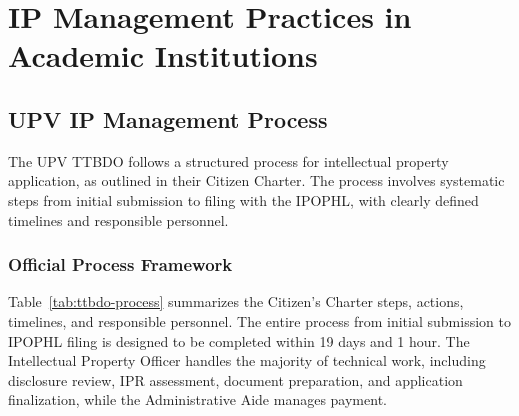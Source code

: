 \section{IP Management Practices in Academic Institutions}

\subsection{UPV IP Management Process}
The UPV TTBDO follows a structured process for intellectual property application, as outlined in their Citizen Charter. The process involves systematic steps from initial submission to filing with the IPOPHL, with clearly defined timelines and responsible personnel.

\subsubsection{Official Process Framework}

Table~\ref{tab:ttbdo-process} summarizes the Citizen's Charter steps, actions, timelines, and responsible personnel. The entire process from initial submission to IPOPHL filing is designed to be completed within 19 days and 1 hour. The Intellectual Property Officer handles the majority of technical work, including disclosure review, IPR assessment, document preparation, and application finalization, while the Administrative Aide manages payment.


